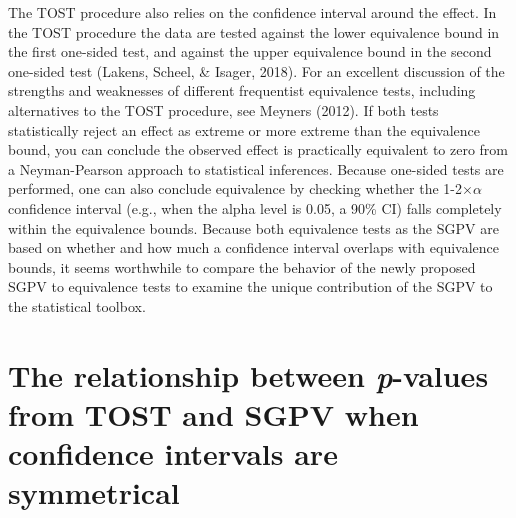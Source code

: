 \documentclass[,man,floatsintext]{apa6}
\begin{document}
The TOST procedure also relies on the confidence interval around the effect.
In the TOST procedure the data are tested against the lower equivalence bound in the first one-sided test, and against the upper equivalence bound in the second one-sided test (Lakens, Scheel, \& Isager, 2018).
For an excellent discussion of the strengths and weaknesses of different frequentist equivalence tests, including alternatives to the TOST procedure, see Meyners (2012).
If both tests statistically reject an effect as extreme or more extreme than the equivalence bound, you can conclude the observed effect is practically equivalent to zero from a Neyman-Pearson approach to statistical inferences.
Because one-sided tests are performed, one can also conclude equivalence by checking whether the 1-2\(\times\)\(\alpha\) confidence interval (e.g., when the alpha level is 0.05, a 90\% CI) falls completely within the equivalence bounds.
Because both equivalence tests as the SGPV are based on whether and how much a confidence interval overlaps with equivalence bounds, it seems worthwhile to compare the behavior of the newly proposed SGPV to equivalence tests to examine the unique contribution of the SGPV to the statistical toolbox.

\hypertarget{the-relationship-between-p-values-from-tost-and-sgpv-when-confidence-intervals-are-symmetrical}{%
\section{\texorpdfstring{The relationship between \emph{p}-values from TOST and SGPV when confidence intervals are symmetrical}{The relationship between p-values from TOST and SGPV when confidence intervals are symmetrical}}\label{the-relationship-between-p-values-from-tost-and-sgpv-when-confidence-intervals-are-symmetrical}}
\end{document}

